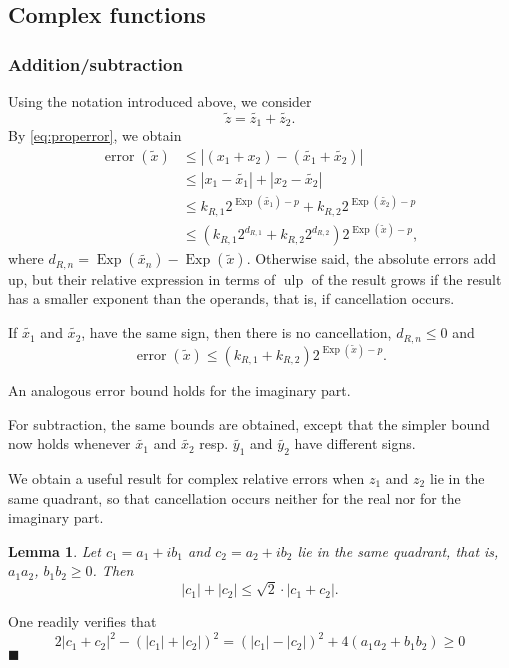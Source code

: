 \documentclass [11pt]{article}
\newcommand {\corr}[1]{{#1}}
\newcommand {\appro}[1]{\widetilde {#1}}
\newcommand {\Ulp}{{\operatorname {ulp}}}
\DeclareMathOperator{\Exp}{\operatorname {Exp}}
\newcommand{\error}{\operatorname {error}}
\renewcommand {\leq}{\leqslant}
\renewcommand {\geq}{\geqslant}
\newtheorem{lemma}[theorem]{Lemma}
\newenvironment{proof}{\noindent{\bf Proof:}}{{\hspace* {\fill}$\blacksquare$}}
\begin{document}
\subsection {Complex functions}

\subsubsection {Addition/subtraction}
\label {sssec:propadd}

Using the notation introduced above, we consider
\[
\appro z = \appro {z_1} + \appro {z_2}.
\]
By \eqref {eq:properror}, we obtain
\begin{align*}
\error (\appro x)
& \leq | (\corr {x_1} + \corr {x_2}) - (\appro {x_1} + \appro {x_2})|
\\
& \leq | \corr {x_1} - \appro {x_1} | + | \corr {x_2} - \appro {x_2}|
\\
& \leq k_{R,1} 2^{\Exp (\appro {x_1}) - p}
+ k_{R,2} 2^{\Exp (\appro {x_2}) - p}
\\
& \leq \left( k_{R,1} 2^{d_{R,1}} + k_{R,2} 2^{d_{R,2}} \right)
2^{\Exp (\appro x) - p},
\end{align*}
where $d_{R,n}=\Exp(\appro {x_n})-\Exp(\appro x)$.
Otherwise said, the absolute errors add up, but their relative expression
in terms of $\Ulp$ of the result grows if the result has a smaller
exponent than the operands, that is, if cancellation occurs.

If $\appro {x_1}$ and $\appro {x_2}$, have the same sign, then there
is no cancellation, $d_{R, n} \leq 0$ and
\[
\error (\appro x) \leq (k_{R,1} + k_{R,2}) 2^{\Exp (\appro x) - p}.
\]

An analogous error bound holds for the imaginary part.

For subtraction, the same bounds are obtained, except that the simpler bound
now holds whenever $\appro {x_1}$ and $\appro {x_2}$ resp.
$\appro {y_1}$ and $\appro {y_2}$ have different signs.

We obtain a useful result for complex relative errors when $z_1$ and $z_2$
lie in the same quadrant, so that cancellation occurs neither for the real
nor for the imaginary part.

\begin {lemma}
\label {lm:arithgeom}
Let $c_1 = a_1 + i b_1$ and $c_2 = a_2 + i b_2$ lie in the same quadrant,
that is, $a_1 a_2$, $b_1 b_2 \geq 0$. Then
\[
|c_1| + |c_2| \leq \sqrt 2 \cdot |c_1 + c_2|.
\]
\end {lemma}

\begin {proof}
One readily verifies that
\[
2 |c_1 + c_2|^2 - (|c_1| + |c_2|)^2
= (|c_1| - |c_2|)^2 + 4 (a_1 a_2 + b_1 b_2)
\geq 0
\]
\end {proof}
\end{document}
